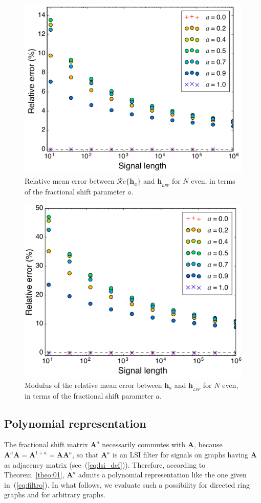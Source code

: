 \begin{figure}[ht!]
	\centering
	\includegraphics[width=0.5\linewidth]{Figures/convergence_even_N_real_part.pdf}
	\caption{Relative mean error between $ \mathcal{R}e\{\mathbf{h}_a\} $ and $ \mathbf{h}_{_{LPF}} $ for $ N $ even, in terms of the fractional shift parameter $a$.}
	\label{fig:convergence_even_N_real_part}
\end{figure}

\begin{figure}[ht!]
	\centering
	\includegraphics[width=0.5\linewidth]{Figures/convergence_even_N_abs_V2.pdf}
	\caption{Modulus of the relative mean error between $ \mathbf{h}_a $ and $ \mathbf{h}_{_{LPF}} $ for $ N $ even, in terms of the fractional shift parameter $a$.}
	\label{fig:convergence_even_N_abs}
	\vspace{-0.3cm}
\end{figure}

\subsection{Polynomial representation}\label{subsec:poly}
The fractional shift matrix $ \mathbf{A}^a$ necessarily commutes with $ \mathbf{A} $, because $ \mathbf{A}^a\mathbf{A} = \mathbf{A}^{1 + a} = \mathbf{A}\mathbf{A}^a  $, so that $ \mathbf{A}^a $ is an LSI filter for signals on graphs having  $ \mathbf{A} $ as adjacency matrix (see~(\ref{eq:lsi_def})). Therefore, according to Theorem~\ref{theo:01}, $\mathbf{A}^a$ admits a polynomial representation like the one given in~(\ref{eq:filtro}). In what follows, we evaluate such a possibility for directed ring graphs and for arbitrary graphs.

